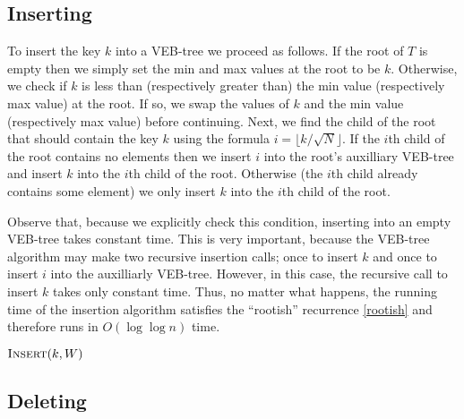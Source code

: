 \subsection{Inserting}

To insert the key $k$ into a VEB-tree we proceed as follows.  If the
root of $T$ is empty then we simply set the min and max values at the
root to be $k$.  Otherwise, we check if $k$ is less than (respectively
greater than) the min value (respectively max value) at the root.  If
so, we swap the values of $k$ and the min value (respectively max
value) before continuing.  Next, we find the child of the root that
should contain the key $k$ using the formula $i=\lfloor
k/\sqrt{N}\rfloor$.  If the $i$th child of the root contains no
elements then we insert $i$ into the root's auxilliary VEB-tree and
insert $k$ into the $i$th child of the root.  Otherwise (the $i$th
child already contains some element) we only insert $k$ into the $i$th
child of the root.

Observe that, because we explicitly check this condition, inserting
into an empty VEB-tree takes constant time.  This is very important,
because the VEB-tree algorithm may make two recursive insertion calls;
once to insert $k$ and once to insert $i$ into the auxilliarly
VEB-tree.  However, in this case, the recursive call to insert $k$
takes only constant time.  Thus, no matter what happens, the running
time of the insertion algorithm satisfies the ``rootish'' recurrence
\eqref{rootish} and therefore runs in $O(\log\log n)$ time.

\noindent$\textsc{Insert}(k,W)$
\begin{algorithmic}[1]
   
\ELSE
     
     
  \ENDIF
  \ENDIF
\ENDIF
\end{algorithmic}

\subsection{Deleting}  

